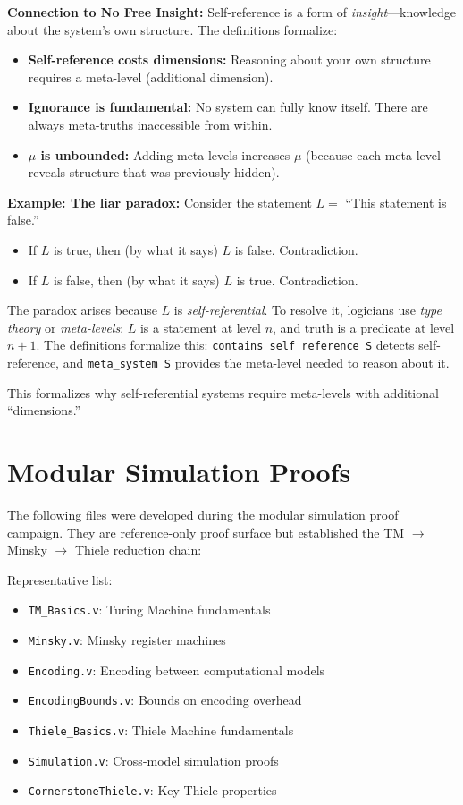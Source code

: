 \textbf{Connection to No Free Insight:} Self-reference is a form of \textit{insight}---knowledge about the system's own structure. The definitions formalize:
\begin{itemize}
    \item \textbf{Self-reference costs dimensions:} Reasoning about your own structure requires a meta-level (additional dimension).
    \item \textbf{Ignorance is fundamental:} No system can fully know itself. There are always meta-truths inaccessible from within.
    \item \textbf{$\mu$ is unbounded:} Adding meta-levels increases $\mu$ (because each meta-level reveals structure that was previously hidden).
\end{itemize}

\textbf{Example: The liar paradox:}
Consider the statement $L = $ ``This statement is false.''
\begin{itemize}
    \item If $L$ is true, then (by what it says) $L$ is false. Contradiction.
    \item If $L$ is false, then (by what it says) $L$ is true. Contradiction.
\end{itemize}
The paradox arises because $L$ is \textit{self-referential}. To resolve it, logicians use \textit{type theory} or \textit{meta-levels}: $L$ is a statement at level $n$, and truth is a predicate at level $n+1$. The definitions formalize this: \texttt{contains\_self\_reference S} detects self-reference, and \texttt{meta\_system S} provides the meta-level needed to reason about it.


This formalizes why self-referential systems require meta-levels with additional ``dimensions.''

\section{Modular Simulation Proofs}

The following files were developed during the modular simulation proof campaign. They are reference-only proof surface but established the TM $\to$ Minsky $\to$ Thiele reduction chain:

Representative list:
\begin{itemize}
    \item \texttt{TM\_Basics.v}: Turing Machine fundamentals
    \item \texttt{Minsky.v}: Minsky register machines
    \item \texttt{Encoding.v}: Encoding between computational models
    \item \texttt{EncodingBounds.v}: Bounds on encoding overhead
    \item \texttt{Thiele\_Basics.v}: Thiele Machine fundamentals
    \item \texttt{Simulation.v}: Cross-model simulation proofs
    \item \texttt{CornerstoneThiele.v}: Key Thiele properties
\end{itemize}

